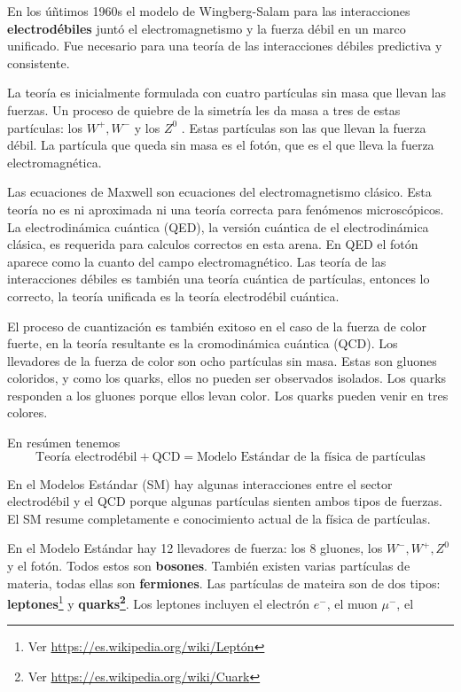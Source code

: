 En los úñtimos 1960s el modelo de Wingberg-Salam para las interacciones \textbf{electrodébiles} juntó el electromagnetismo y la fuerza débil en un marco unificado. Fue necesario para una teoría de las interacciones débiles predictiva y consistente.

La teoría es inicialmente formulada con cuatro partículas sin masa que llevan las fuerzas. Un proceso de quiebre de la simetría les da masa a tres de estas partículas: los $W^+, W^-$ y los $Z^0$ . Estas partículas son las que llevan la fuerza débil. La partícula que queda sin masa es el fotón, que es el que lleva la fuerza electromagnética.

Las ecuaciones de Maxwell son ecuaciones del electromagnetismo clásico. Esta teoría no es ni aproximada ni una teoría correcta para fenómenos microscópicos. La electrodinámica cuántica (QED), la versión cuántica de el electrodinámica clásica, es requerida para calculos correctos en esta arena. En QED el fotón aparece como la cuanto del campo electromagnético. Las teoría de las interacciones débiles es también una teoría cuántica de partículas, entonces lo correcto, la teoría unificada es la teoría electrodébil cuántica.

El proceso de cuantización es también exitoso en el caso de la fuerza de color fuerte, en la teoría resultante es la cromodinámica cuántica (QCD). Los llevadores de la fuerza de color son ocho partículas sin masa. Estas son gluones coloridos, y como los quarks, ellos no pueden ser observados isolados.  Los quarks responden a los gluones porque ellos levan color. Los quarks pueden venir en tres colores.

En resúmen tenemos
\begin{equation}
    \text{Teoría electrodébil} + \text{QCD} = \text{Modelo Estándar de la física de partículas}
\end{equation}

En el Modelos Estándar (SM) hay algunas interacciones entre el sector electrodébil y el QCD porque algunas partículas sienten ambos tipos de fuerzas. El SM resume completamente e conocimiento actual de la física de partículas.

En el Modelo Estándar hay 12 llevadores de fuerza: los 8 gluones, los $W^-,W^+,Z^0$ y el fotón. Todos estos son \textbf{bosones}. También existen varias partículas de materia, todas ellas son \textbf{fermiones}. Las partículas de mateira son de dos tipos: \textbf{leptones}\footnote{Ver \url{https://es.wikipedia.org/wiki/Leptón}} y \textbf{quarks\footnote{Ver \url{https://es.wikipedia.org/wiki/Cuark}}}. Los leptones incluyen el electrón $e^-$, el muon $\mu^-$, el
